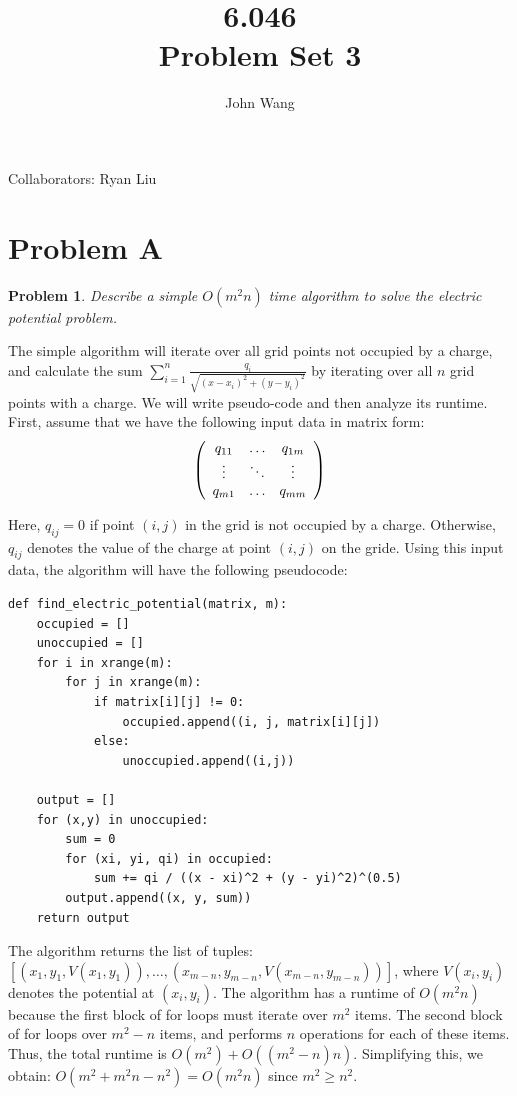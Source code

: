 \documentclass[psamsfonts]{amsart}
\title{6.046 \\
Problem Set 3}
\author{John Wang}
\newtheorem{prob}{Problem}[section]
\newenvironment{sol}{{\bfseries Solution}}{\qedsymbol}
\theoremstyle{definition}
\theoremstyle{remark}
\numberwithin{equation}{section}
\begin{document}
\maketitle

Collaborators: Ryan Liu

\section{Problem A}

\begin{prob}
Describe a simple $O(m^2n)$ time algorithm to solve the electric potential problem. 
\end{prob}

\begin{sol}
The simple algorithm will iterate over all grid points not occupied by a charge, and calculate the sum $\sum_{i=1}^n \frac{q_i}{\sqrt{(x - x_i)^2 + (y - y_i)^2}}$ by iterating over all $n$ grid points with a charge. We will write pseudo-code and then analyze its runtime. First, assume that we have the following input data in matrix form:
\begin{equation}
\left( \begin{array}{c c c}
 q_{11} & \ldots & q_{1m} \\
\vdots & \ddots & \vdots \\
q_{m1} & \ldots & q_{mm}
\end{array} \right)
\end{equation}

Here, $q_{ij} = 0$ if point $(i,j)$ in the grid is not occupied by a charge. Otherwise, $q_{ij}$ denotes the value of the charge at point $(i,j)$ on the gride. Using this input data, the algorithm will have the following pseudocode:

\begin{verbatim}
def find_electric_potential(matrix, m):
    occupied = []
    unoccupied = []
    for i in xrange(m):
        for j in xrange(m):
            if matrix[i][j] != 0:
                occupied.append((i, j, matrix[i][j])
            else:
                unoccupied.append((i,j))

    output = []    
    for (x,y) in unoccupied:
        sum = 0
        for (xi, yi, qi) in occupied:
            sum += qi / ((x - xi)^2 + (y - yi)^2)^(0.5)
        output.append((x, y, sum))
    return output
\end{verbatim}

The algorithm returns the list of tuples: $[(x_1, y_1, V(x_1, y_1)), \ldots, (x_{m-n}, y_{m-n}, V(x_{m-n}, y_{m-n}))]$, where $V(x_i, y_i)$ denotes the potential at $(x_i, y_i)$. The algorithm has a runtime of $O(m^2n)$ because the first block of for loops must iterate over $m^2$ items. The second block of for loops over $m^2 -n$ items, and performs $n$ operations for each of these items. Thus, the total runtime is $O(m^2) + O((m^2-n)n)$. Simplifying this, we obtain: $O(m^2 + m^2n - n^2) = O(m^2n)$ since $m^2 \geq n^2$.    


\end{sol}
\end{document}
